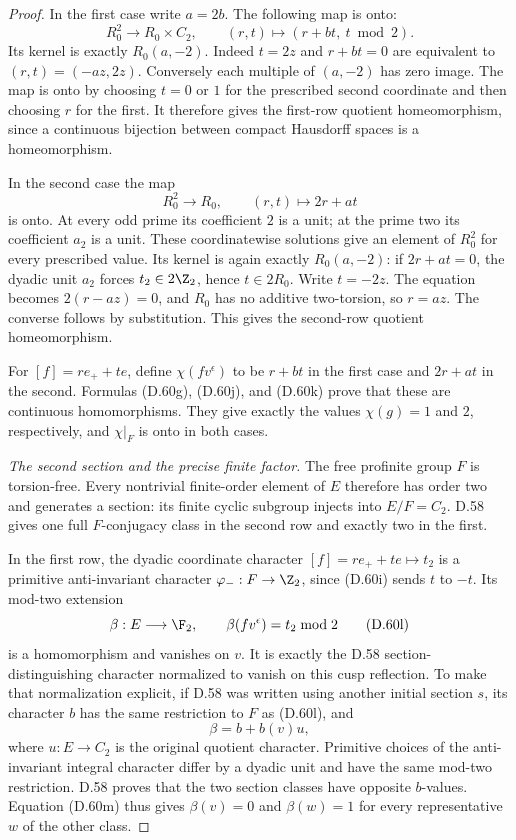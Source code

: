 \begin{proof}
In the first case write $a=2b$.
The following map is onto:
\[
 R_0^2\longrightarrow R_0\times C_2,\qquad
                   (r,t)\longmapsto(r+bt,\ t\bmod2).
                                                               \tag{D.60j}
\]
Its kernel is exactly $R_0(a,-2)$.
Indeed $t=2z$ and $r+bt=0$ are equivalent to
$(r,t)=(-az,2z)$.
Conversely each multiple of $(a,-2)$ has zero
image. The map is onto by choosing $t=0$ or $1$
for the prescribed second coordinate and then
choosing $r$ for the first.
It therefore gives the first-row quotient
homeomorphism, since a continuous bijection
between compact Hausdorff spaces is a
homeomorphism.

In the second case the map
\[
 R_0^2\longrightarrow R_0,\qquad
                         (r,t)\longmapsto2r+at          \tag{D.60k}
\]
is onto.
At every odd prime its coefficient $2$ is a
unit; at the prime two its coefficient $a_2$
is a unit. These coordinatewise solutions
give an element of $R_0^2$ for every prescribed
value. Its kernel is again exactly
$R_0(a,-2)$:
if $2r+at=0$, the dyadic unit $a_2$ forces
$t_2\in2\Z_2$, hence $t\in2R_0$.
Write $t=-2z$. The equation becomes
$2(r-az)=0$, and $R_0$ has no additive
two-torsion, so $r=az$.
The converse follows by substitution.
This gives the second-row quotient
homeomorphism.

For $[f]=r e_++t e$, define $\chi(fv^\epsilon)$
to be $r+bt$ in the first case and $2r+at$
in the second. Formulas (D.60g), (D.60j), and
(D.60k) prove that these are continuous
homomorphisms. They give exactly the values
$\chi(g)=1$ and $2$, respectively, and
$\chi|_F$ is onto in both cases.

\emph{The second section and the precise finite factor.}
The free profinite group $F$ is torsion-free.
Every nontrivial finite-order element of $E$
therefore has order two and generates a section:
its finite cyclic subgroup injects into
$E/F=C_2$.
D.58 gives one full $F$-conjugacy class in the
second row and exactly two in the first.

In the first row, the dyadic coordinate
character $[f]=r e_++t e\mapsto t_2$ is a
primitive anti-invariant character
$\varphi_-:F\to\Z_2$, since (D.60i) sends
$t$ to $-t$.
Its mod-two extension
\[
 \beta:E\longrightarrow\F_2,\qquad
                    \beta(fv^\epsilon)=t_2\bmod2        \tag{D.60l}
\]
is a homomorphism and vanishes on $v$.
It is exactly the D.58 section-distinguishing
character normalized to vanish on this cusp
reflection.
To make that normalization explicit, if D.58
was written using another initial section $s$,
its character $b$ has the same restriction
to $F$ as (D.60l), and
\[
                         \beta=b+b(v)u,                 \tag{D.60m}
\]
where $u:E\to C_2$ is the original quotient
character. Primitive choices of the
anti-invariant integral character differ by
a dyadic unit and have the same mod-two
restriction. D.58 proves that the two section
classes have opposite $b$-values.
Equation (D.60m) thus gives
$\beta(v)=0$ and $\beta(w)=1$ for every
representative $w$ of the other class.


\end{proof}
